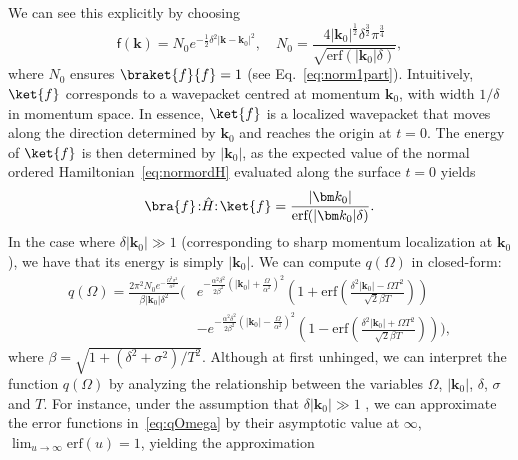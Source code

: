 \documentclass[letterpaper,12pt,titlepage,oneside,final]{book}
\newcommand{\normord}[1]{\vcentcolon\mathrel{#1}\vcentcolon}
\providecommand{\vcentcolon}{\mathrel{\mathop{:}}}
\newcommand{\mf}{\mathsf}%
\begin{document}
We can see this explicitly by choosing
\begin{equation}
    \mf f(\bm k) = N_0 e^{- \frac{1}{2}\delta^2|\bm k - \bm k_0|^2}, \quad N_0 = \frac{4 |\bm k_0|^\frac{1}{2}\delta^\frac{3}{2}\pi^\frac{3}{4}}{\sqrt{\text{erf}(|\bm k_0|\delta)}},
\end{equation}
where $N_0$ ensures $\braket{f}{f} = 1$ (see Eq.~\eqref{eq:norm1part}). Intuitively, $\ket{f}$ corresponds to a wavepacket centred at momentum $\bm k_0$, with width $1/\delta$ in momentum space. In essence, $\ket{f}$ is a localized wavepacket that moves along the direction determined by $\bm k_0$ and reaches the origin at $t=0$. The energy of $\ket{f}$ is then determined by $|\bm k_0|$, as the expected value of the normal ordered Hamiltonian~\eqref{eq:normordH} evaluated along the surface $t=0$ yields
\begin{equation}
    \bra{f}\!\normord{\hat{H}}\!\ket{f} = \frac{|\bm k_0|}{\text{erf}(|\bm k_0|\delta)}.
\end{equation}
In the case where $\delta |\bm k_0|\gg 1$ (corresponding to sharp momentum localization at $\bm k_0$), we have that its energy is simply $|\bm k_0|$. We can compute $q(\Omega)$ in closed-form:
\begin{align}
    q(\Omega) = \frac{2\pi^2N_0 e^{-\frac{\Omega^2\sigma^2}{\alpha^2}}}{\beta|\bm k_0|\delta^2} \Bigg(&e^{- \frac{\alpha^2\delta^2}{2 \beta^2}\left(|\bm k_0| + \frac{\Omega}{\alpha^2}\right)^2}\left(1 + \text{erf}\left(\frac{\delta^2 |\bm k_0| -  \Omega T^2}{\sqrt{2}\beta T}\right)\right)\label{eq:qOmega}\\
    &-e^{- \frac{\alpha^2\delta^2}{2 \beta^2}\left(|\bm k_0| - \frac{\Omega}{\alpha^2}\right)^2}\left(1 - \text{erf}\left(\frac{\delta^2 |\bm k_0| +  \Omega T^2}{\sqrt{2}\beta T}\right)\right)\Bigg)\nonumber,
\end{align}%
where $\beta = \sqrt{1 + (\delta^2 + \sigma^2)/T^2}$. Although at first unhinged, we can interpret the function $q(\Omega)$ by analyzing the relationship between the variables $\Omega$, $|\bm k_0|$, $\delta$, $\sigma$ and $T$. For instance, under the assumption that $\delta |\bm k_0|\gg 1$ , we can approximate the error functions in~\eqref{eq:qOmega} by their asymptotic value at $\infty$, $\lim_{u\to\infty}\text{erf}(u) = 1$, yielding the approximation
\end{document}
